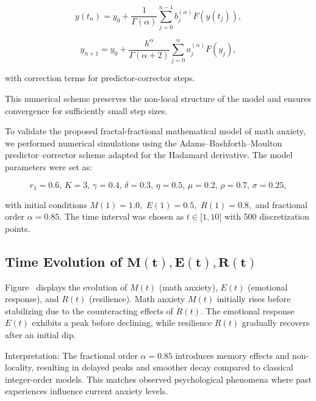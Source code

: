 \documentclass[10pt]{NSP1}
\begin{document}
\[
y\left( t_{n} \right) = y_{0} + \frac{1}{\Gamma(\alpha)}\sum_{j = 0}^{n - 1}{}b_{j}^{(\alpha)}F\left( y\left( t_{j} \right) \right),
\]

\par\vspace{9.0pt}\vspace{9.0pt}

\[
y_{n + 1} = y_{0} + \frac{h^{\alpha}}{\Gamma(\alpha + 2)}\sum_{j = 0}^{n}{}a_{j}^{(\alpha)}F\left( y_{j} \right),
\]

with correction terms for predictor-corrector steps.

This numerical scheme preserves the non-local structure of the model and ensures convergence for sufficiently small step sizes.

\par\medskip{}\smallskip

To validate the proposed fractal-fractional mathematical model of math anxiety, we performed numerical simulations using the Adams–Bashforth–Moulton predictor–corrector scheme adapted for the Hadamard derivative. The model parameters were set as:

\[
r_{1} = 0.6,\, K = 3,\,\gamma = 0.4,\,\delta = 0.3,\,\eta = 0.5,\,\mu = 0.2,\,\rho = 0.7,\,\sigma = 0.25,
\]

with initial conditions \(M(1) = 1.0,\mspace{6mu} E(1) = 0.5,\mspace{6mu} R(1) = 0.8,\) and fractional order \(\alpha = 0.85.\) The time interval was chosen as \(t \in \lbrack 1,10\rbrack\) with 500 discretization points.

\subsection*{Time Evolution of \(\mathbf{M}\left( \mathbf{t} \right)\mathbf{,E}\left( \mathbf{t} \right)\mathbf{,R}\left( \mathbf{t} \right)\)}

Figure  displays the evolution of \(M(t)\) (math anxiety), \(E(t)\) (emotional response), and \(R(t)\) (resilience). Math anxiety \(M(t)\) initially rises before stabilizing due to the counteracting effects of \(R(t)\). The emotional response \(E(t)\) exhibits a peak before declining, while resilience \(R(t)\) gradually recovers after an initial dip.

Interpretation: The fractional order \(\alpha = 0.85\) introduces memory effects and non-locality, resulting in delayed peaks and smoother decay compared to classical integer-order models. This matches observed psychological phenomena where past experiences influence current anxiety levels.
\end{document}
